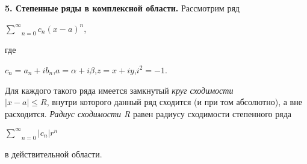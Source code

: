 \documentclass{book}
\begin{document}
\singlespacing
\qquad \textbf{5. Степенные ряды в комплексной области.} Рассмотрим ряд
\begin{center}
    \(\underset{n = 0}{\overset{\infty}{\sum}} c_n(x - a)^n\),
\end{center}
где
\begin{center} 
    \(c_n = a_n + ib_n\),\quad \(a = \alpha + i\beta\),\quad \(z = x + iy\),\quad \(i^2 = -1\).
\end{center}

Для каждого такого ряда имеется замкнутый \emph{круг сходимости}\\ \(|x - a| \leqslant R\), внутри которого данный ряд сходится (и при том абсолютно), а вне расходится. \emph{Радиус сходимости R} равен радиусу сходимости степенного ряда\\

\begin{center}
    \(\underset{n = 0}{\overset{\infty}{\sum}}|c_n|r^n\)\\
\end{center}
в действительной области.
\end{document}
